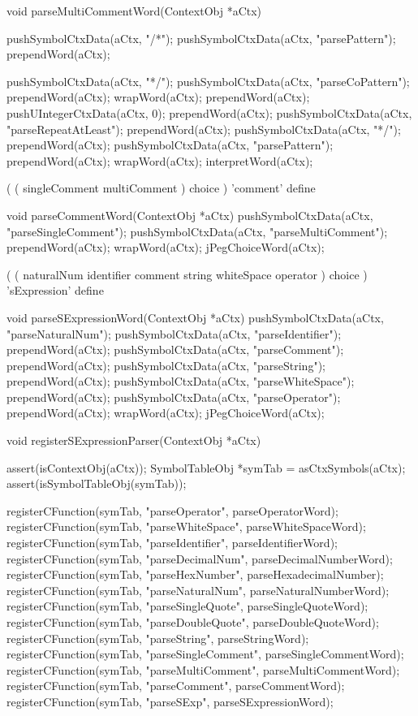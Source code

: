 \startCCode
void parseMultiCommentWord(ContextObj *aCtx) {
  pushSymbolCtxData(aCtx, "/*");
  pushSymbolCtxData(aCtx, "parsePattern");
  prependWord(aCtx);
  
  pushSymbolCtxData(aCtx, "*/");
  pushSymbolCtxData(aCtx, "parseCoPattern");
  prependWord(aCtx);
  wrapWord(aCtx);
  prependWord(aCtx);
  pushUIntegerCtxData(aCtx, 0);
  prependWord(aCtx);
  pushSymbolCtxData(aCtx, "parseRepeatAtLeast");
  prependWord(aCtx);
  pushSymbolCtxData(aCtx, "*/");
  prependWord(aCtx);
  pushSymbolCtxData(aCtx, "parsePattern");
  prependWord(aCtx);
  wrapWord(aCtx);
  interpretWord(aCtx);
}
\stopCCode

\starttyping
(
  ( singleComment multiComment ) choice
) 'comment' define
\stoptyping

\startCCode
void parseCommentWord(ContextObj *aCtx) {
  pushSymbolCtxData(aCtx, "parseSingleComment");
  pushSymbolCtxData(aCtx, "parseMultiComment");
  prependWord(aCtx);
  wrapWord(aCtx);
  jPegChoiceWord(aCtx);
}
\stopCCode

\starttyping
(
  (
    naturalNum
    identifier
    comment
    string
    whiteSpace
    operator
  ) choice
) 'sExpression' define
\stoptyping

\startCCode
void parseSExpressionWord(ContextObj *aCtx) {
  pushSymbolCtxData(aCtx, "parseNaturalNum");
  pushSymbolCtxData(aCtx, "parseIdentifier");
  prependWord(aCtx);
  pushSymbolCtxData(aCtx, "parseComment");
  prependWord(aCtx);
  pushSymbolCtxData(aCtx, "parseString");
  prependWord(aCtx);
  pushSymbolCtxData(aCtx, "parseWhiteSpace");
  prependWord(aCtx);
  pushSymbolCtxData(aCtx, "parseOperator");
  prependWord(aCtx);
  wrapWord(aCtx);
  jPegChoiceWord(aCtx);
}
\stopCCode

\startCCode
void registerSExpressionParser(ContextObj *aCtx) {
  assert(isContextObj(aCtx));
  SymbolTableObj *symTab = asCtxSymbols(aCtx);
  assert(isSymbolTableObj(symTab));
  
  registerCFunction(symTab, "parseOperator",      parseOperatorWord);
  registerCFunction(symTab, "parseWhiteSpace",    parseWhiteSpaceWord);
  registerCFunction(symTab, "parseIdentifier",    parseIdentifierWord);
  registerCFunction(symTab, "parseDecimalNum",    parseDecimalNumberWord);
  registerCFunction(symTab, "parseHexNumber",     parseHexadecimalNumber);
  registerCFunction(symTab, "parseNaturalNum",    parseNaturalNumberWord);
  registerCFunction(symTab, "parseSingleQuote",   parseSingleQuoteWord);
  registerCFunction(symTab, "parseDoubleQuote",   parseDoubleQuoteWord);
  registerCFunction(symTab, "parseString",        parseStringWord);
  registerCFunction(symTab, "parseSingleComment", parseSingleCommentWord);
  registerCFunction(symTab, "parseMultiComment",  parseMultiCommentWord);
  registerCFunction(symTab, "parseComment",       parseCommentWord);
  registerCFunction(symTab, "parseSExp",          parseSExpressionWord);
}
\stopCCode

